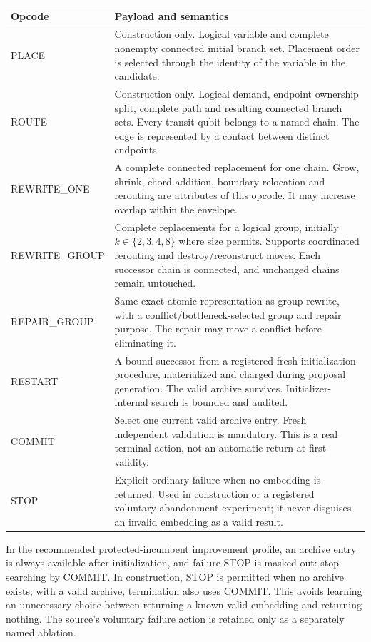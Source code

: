 {\small\begin{longtable}{@{}P{.20\textwidth}P{.73\textwidth}@{}}
\toprule
Opcode & Payload and semantics\\\midrule\endhead
PLACE & Construction only. Logical variable and complete nonempty connected initial branch set. Placement order is selected through the identity of the variable in the candidate.\\
ROUTE & Construction only. Logical demand, endpoint ownership split, complete path and resulting connected branch sets. Every transit qubit belongs to a named chain. The edge is represented by a contact between distinct endpoints.\\
REWRITE\_ONE & A complete connected replacement for one chain. Grow, shrink, chord addition, boundary relocation and rerouting are attributes of this opcode. It may increase overlap within the envelope.\\
REWRITE\_GROUP & Complete replacements for a logical group, initially $k\in\{2,3,4,8\}$ where size permits. Supports coordinated rerouting and destroy/reconstruct moves. Each successor chain is connected, and unchanged chains remain untouched.\\
REPAIR\_GROUP & Same exact atomic representation as group rewrite, with a conflict/bottleneck-selected group and repair purpose. The repair may move a conflict before eliminating it.\\
RESTART & A bound successor from a registered fresh initialization procedure, materialized and charged during proposal generation. The valid archive survives. Initializer-internal search is bounded and audited.\\
COMMIT & Select one current valid archive entry. Fresh independent validation is mandatory. This is a real terminal action, not an automatic return at first validity.\\
STOP & Explicit ordinary failure when no embedding is returned. Used in construction or a registered voluntary-abandonment experiment; it never disguises an invalid embedding as a valid result.\\
\bottomrule
\end{longtable}}

In the recommended protected-incumbent improvement profile, an archive entry is always available after initialization, and failure-STOP is masked out: stop searching by COMMIT. In construction, STOP is permitted when no archive exists; with a valid archive, termination also uses COMMIT. This avoids learning an unnecessary choice between returning a known valid embedding and returning nothing. The source's voluntary failure action is retained only as a separately named ablation.

